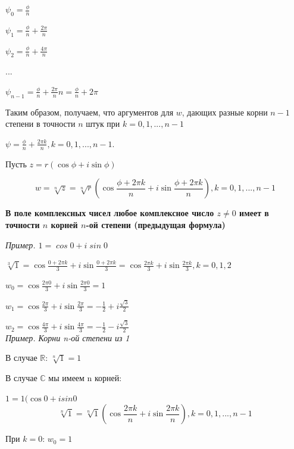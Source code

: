 \documentclass[a4paper]{article}
\begin{document}
$\displaystyle \psi_0 = \frac{\phi}{n}$

$\displaystyle \psi_1 = \frac{\phi}{n} + \frac{2\pi}{n}$

$\displaystyle \psi_2 = \frac{\phi}{n} + \frac{4\pi}{n}$

...

$\displaystyle \psi_{n-1} = \frac{\phi}{n} + \frac{2\pi}{n}n = \frac{\phi}{n} + 2\pi$

Таким образом, получаем, что аргументов для $w$, дающих разные корни $n-1$ степени в точности $n$ штук при $k =0, 1, ..., n-1$

$\psi = \frac{\phi}{n} + \frac{2\pi k}{n}, k = 0, 1, ..., n-1$.


Пусть $z = r(\cos \phi + i \sin \phi)$

\begin{equation}
\displaystyle w = \sqrt[n]{z} = \sqrt[n]{r} \left( \cos \frac{\phi + 2\pi k}{n} + i \sin \frac{\phi + 2\pi k}{n} \right), k = 0,1,...,n-1
\end{equation}

\textbf{В поле комплексных чисел любое комплексное число $z \neq 0$ имеет в точности $n$ корней $n$-ой степени (предыдущая формула)}

\textit{Пример. $\mathit{1 = \cos 0 + i \sin 0}$}

$\displaystyle \sqrt[3]{1} = \cos \frac{0+2\pi k}{3} + i \sin \frac{0 + 2\pi k}{3} = \cos \frac{2 \pi k}{3} + i \sin \frac{2 \pi k}{3}, k = 0,1,2$

$\displaystyle w_0 = \cos \frac{2 \pi 0}{3} + i \sin \frac{2 \pi 0}{3} = 1$

$\displaystyle w_1 = \cos \frac{2 \pi}{3} + i \sin \frac{2 \pi}{3} = -\frac{1}{2} + i\frac{\sqrt{3}}{2}$

$\displaystyle w_2 = \cos \frac{4 \pi}{3} + i \sin \frac{4 \pi}{3} = -\frac{1}{2} - i\frac{\sqrt{3}}{2}$\\

\textit{Пример. Корни n-ой степени из 1}

В случае $\mathbb{R}$: $\sqrt[n]{1} = 1$

В случае $\mathbb{C}$ мы имеем n корней:

$1 = 1(\cos 0 + i sin 0$
\begin{equation}
\displaystyle \sqrt[n]{1} = \sqrt[n]{1} \left( \cos \frac{2\pi k}{n} + i \sin \frac{2 \pi k}{n} \right), k=0,1,...,n-1
\end{equation}


При $k=0$: $w_0 = 1$
\end{document}
